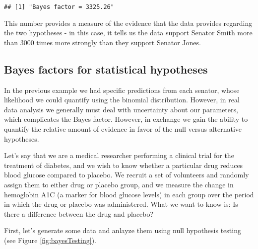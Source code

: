 \documentclass[]{book}
\newenvironment{Shaded}{\begin{snugshade}}{\end{snugshade}}
\newcommand{\KeywordTok}[1]{\textcolor[rgb]{0.13,0.29,0.53}{\textbf{#1}}}
\newcommand{\DataTypeTok}[1]{\textcolor[rgb]{0.13,0.29,0.53}{#1}}
\newcommand{\DecValTok}[1]{\textcolor[rgb]{0.00,0.00,0.81}{#1}}
\newcommand{\FloatTok}[1]{\textcolor[rgb]{0.00,0.00,0.81}{#1}}
\newcommand{\StringTok}[1]{\textcolor[rgb]{0.31,0.60,0.02}{#1}}
\newcommand{\CommentTok}[1]{\textcolor[rgb]{0.56,0.35,0.01}{\textit{#1}}}
\newcommand{\OperatorTok}[1]{\textcolor[rgb]{0.81,0.36,0.00}{\textbf{#1}}}
\newcommand{\NormalTok}[1]{#1}
\theoremstyle{definition}
\theoremstyle{definition}
\theoremstyle{definition}
\theoremstyle{remark}
\begin{document}
\begin{verbatim}
## [1] "Bayes factor = 3325.26"
\end{verbatim}

This number provides a measure of the evidence that the data provides
regarding the two hypotheses - in this case, it tells us the data
support Senator Smith more than 3000 times more strongly than they
support Senator Jones.

\subsection{Bayes factors for statistical
hypotheses}\label{bayes-factors-for-statistical-hypotheses}

In the previous example we had specific predictions from each senator,
whose likelihood we could quantify using the binomial distribution.
However, in real data analysis we generally must deal with uncertainty
about our parameters, which complicates the Bayes factor. However, in
exchange we gain the ability to quantify the relative amount of evidence
in favor of the null versus alternative hypotheses.

Let's say that we are a medical researcher performing a clinical trial
for the treatment of diabetes, and we wish to know whether a particular
drug reduces blood glucose compared to placebo. We recruit a set of
volunteers and randomly assign them to either drug or placebo group, and
we measure the change in hemoglobin A1C (a marker for blood glucose
levels) in each group over the period in which the drug or placebo was
administered. What we want to know is: Is there a difference between the
drug and placebo?

First, let's generate some data and anlayze them using null hypothesis
testing (see Figure \ref{fig:bayesTesting}).

\begin{Shaded}
\end{Shaded}
\end{document}
